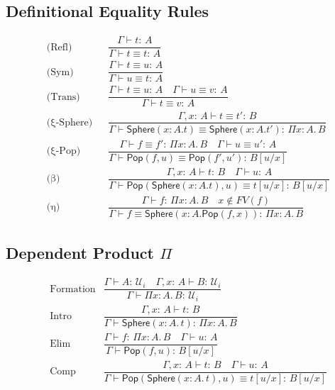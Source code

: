 \documentclass[12pt]{article}
\newcommand{\Entails}{\vdash}
\newcommand{\Types}{:\,}
\newcommand{\Subst}[2]{[#1/#2]}
\newcommand{\Sphere}{\mathsf{Sphere}}
\newcommand{\Pop}{\mathsf{Pop}}
\newcommand{\Ctx}{\Gamma}
\newcommand{\UU}[1]{\mathcal{U}_{#1}}
\newcommand{\PiT}[3]{\Pi #1 : #2.\, #3}
\theoremstyle{definition}
\begin{document}
\subsection{Definitional Equality Rules}
\begin{align*}
&\text{(Refl)} && \dfrac{\Ctx \Entails t \Types A}{\Ctx \Entails t \equiv t \Types A} \\
&\text{(Sym)} && \dfrac{\Ctx \Entails t \equiv u \Types A}{\Ctx \Entails u \equiv t \Types A} \\
&\text{(Trans)} && \dfrac{\Ctx \Entails t \equiv u \Types A \quad \Ctx \Entails u \equiv v \Types A}
                         {\Ctx \Entails t \equiv v \Types A} \\
&\text{(ξ-Sphere)} && \dfrac{\Ctx, x \Types A \Entails t \equiv t' \Types B}
                            {\Ctx \Entails \Sphere(x:A.t) \equiv \Sphere(x:A.t') \Types \PiT{x}{A}{B}} \\
&\text{(ξ-Pop)} && \dfrac{\Ctx \Entails f \equiv f' \Types \PiT{x}{A}{B} \quad \Ctx \Entails u \equiv u' \Types A}
                         {\Ctx \Entails \Pop(f,u) \equiv \Pop(f',u') \Types B[u/x]} \\
&\text{(β)} && \dfrac{\Ctx,x\Types A \Entails t \Types B \quad \Ctx \Entails u \Types A}
                     {\Ctx \Entails \Pop(\Sphere(x:A.t),u) \equiv t[u/x] \Types B[u/x]} \\
&\text{(η)} && \dfrac{\Ctx \Entails f \Types \PiT{x}{A}{B} \quad x \notin FV(f)}
                     {\Ctx \Entails f \equiv \Sphere(x:A.\Pop(f,x)) \Types \PiT{x}{A}{B}}
\end{align*}

\subsection{Dependent Product $\Pi$}
\begin{align*}
&\text{Formation} & \dfrac{\Ctx \Entails A \Types \UU{i} \quad \Ctx,x\Types A \Entails B \Types \UU{i}}{\Ctx \Entails \PiT{x}{A}{B} \Types \UU{i}} \\
&\text{Intro} & \dfrac{\Ctx,x\Types A \Entails t \Types B}{\Ctx \Entails \Sphere(x\!:\!A.\,t) \Types \PiT{x}{A}{B}} \\
&\text{Elim} & \dfrac{\Ctx \Entails f \Types \PiT{x}{A}{B} \quad \Ctx \Entails u \Types A}{\Ctx \Entails \Pop(f,u) \Types B\Subst{u}{x}} \\
&\text{Comp} & \dfrac{\Ctx,x\Types A \Entails t \Types B \quad \Ctx \Entails u \Types A}{\Ctx \Entails \Pop(\Sphere(x\!:\!A.\,t),u) \equiv t\Subst{u}{x} \Types B\Subst{u}{x}}
\end{align*}
\end{document}
